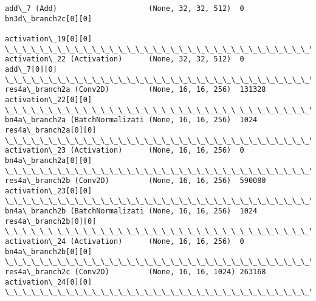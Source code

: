 \documentclass[11pt]{article}
\begin{document}
\begin{Verbatim}[commandchars=\\\{\}]
add\_7 (Add)                     (None, 32, 32, 512)  0           bn3d\_branch2c[0][0]              
                                                                 activation\_19[0][0]              
\_\_\_\_\_\_\_\_\_\_\_\_\_\_\_\_\_\_\_\_\_\_\_\_\_\_\_\_\_\_\_\_\_\_\_\_\_\_\_\_\_\_\_\_\_\_\_\_\_\_\_\_\_\_\_\_\_\_\_\_\_\_\_\_\_\_\_\_\_\_\_\_\_\_\_\_\_\_\_\_\_\_\_\_\_\_\_\_\_\_\_\_\_\_\_\_\_\_
activation\_22 (Activation)      (None, 32, 32, 512)  0           add\_7[0][0]                      
\_\_\_\_\_\_\_\_\_\_\_\_\_\_\_\_\_\_\_\_\_\_\_\_\_\_\_\_\_\_\_\_\_\_\_\_\_\_\_\_\_\_\_\_\_\_\_\_\_\_\_\_\_\_\_\_\_\_\_\_\_\_\_\_\_\_\_\_\_\_\_\_\_\_\_\_\_\_\_\_\_\_\_\_\_\_\_\_\_\_\_\_\_\_\_\_\_\_
res4a\_branch2a (Conv2D)         (None, 16, 16, 256)  131328      activation\_22[0][0]              
\_\_\_\_\_\_\_\_\_\_\_\_\_\_\_\_\_\_\_\_\_\_\_\_\_\_\_\_\_\_\_\_\_\_\_\_\_\_\_\_\_\_\_\_\_\_\_\_\_\_\_\_\_\_\_\_\_\_\_\_\_\_\_\_\_\_\_\_\_\_\_\_\_\_\_\_\_\_\_\_\_\_\_\_\_\_\_\_\_\_\_\_\_\_\_\_\_\_
bn4a\_branch2a (BatchNormalizati (None, 16, 16, 256)  1024        res4a\_branch2a[0][0]             
\_\_\_\_\_\_\_\_\_\_\_\_\_\_\_\_\_\_\_\_\_\_\_\_\_\_\_\_\_\_\_\_\_\_\_\_\_\_\_\_\_\_\_\_\_\_\_\_\_\_\_\_\_\_\_\_\_\_\_\_\_\_\_\_\_\_\_\_\_\_\_\_\_\_\_\_\_\_\_\_\_\_\_\_\_\_\_\_\_\_\_\_\_\_\_\_\_\_
activation\_23 (Activation)      (None, 16, 16, 256)  0           bn4a\_branch2a[0][0]              
\_\_\_\_\_\_\_\_\_\_\_\_\_\_\_\_\_\_\_\_\_\_\_\_\_\_\_\_\_\_\_\_\_\_\_\_\_\_\_\_\_\_\_\_\_\_\_\_\_\_\_\_\_\_\_\_\_\_\_\_\_\_\_\_\_\_\_\_\_\_\_\_\_\_\_\_\_\_\_\_\_\_\_\_\_\_\_\_\_\_\_\_\_\_\_\_\_\_
res4a\_branch2b (Conv2D)         (None, 16, 16, 256)  590080      activation\_23[0][0]              
\_\_\_\_\_\_\_\_\_\_\_\_\_\_\_\_\_\_\_\_\_\_\_\_\_\_\_\_\_\_\_\_\_\_\_\_\_\_\_\_\_\_\_\_\_\_\_\_\_\_\_\_\_\_\_\_\_\_\_\_\_\_\_\_\_\_\_\_\_\_\_\_\_\_\_\_\_\_\_\_\_\_\_\_\_\_\_\_\_\_\_\_\_\_\_\_\_\_
bn4a\_branch2b (BatchNormalizati (None, 16, 16, 256)  1024        res4a\_branch2b[0][0]             
\_\_\_\_\_\_\_\_\_\_\_\_\_\_\_\_\_\_\_\_\_\_\_\_\_\_\_\_\_\_\_\_\_\_\_\_\_\_\_\_\_\_\_\_\_\_\_\_\_\_\_\_\_\_\_\_\_\_\_\_\_\_\_\_\_\_\_\_\_\_\_\_\_\_\_\_\_\_\_\_\_\_\_\_\_\_\_\_\_\_\_\_\_\_\_\_\_\_
activation\_24 (Activation)      (None, 16, 16, 256)  0           bn4a\_branch2b[0][0]              
\_\_\_\_\_\_\_\_\_\_\_\_\_\_\_\_\_\_\_\_\_\_\_\_\_\_\_\_\_\_\_\_\_\_\_\_\_\_\_\_\_\_\_\_\_\_\_\_\_\_\_\_\_\_\_\_\_\_\_\_\_\_\_\_\_\_\_\_\_\_\_\_\_\_\_\_\_\_\_\_\_\_\_\_\_\_\_\_\_\_\_\_\_\_\_\_\_\_
res4a\_branch2c (Conv2D)         (None, 16, 16, 1024) 263168      activation\_24[0][0]              
\_\_\_\_\_\_\_\_\_\_\_\_\_\_\_\_\_\_\_\_\_\_\_\_\_\_\_\_\_\_\_\_\_\_\_\_\_\_\_\_\_\_\_\_\_\_\_\_\_\_\_\_\_\_\_\_\_\_\_\_\_\_\_\_\_\_\_\_\_\_\_\_\_\_\_\_\_\_\_\_\_\_\_\_\_\_\_\_\_\_\_\_\_\_\_\_\_\_

\end{Verbatim}
\end{document}
